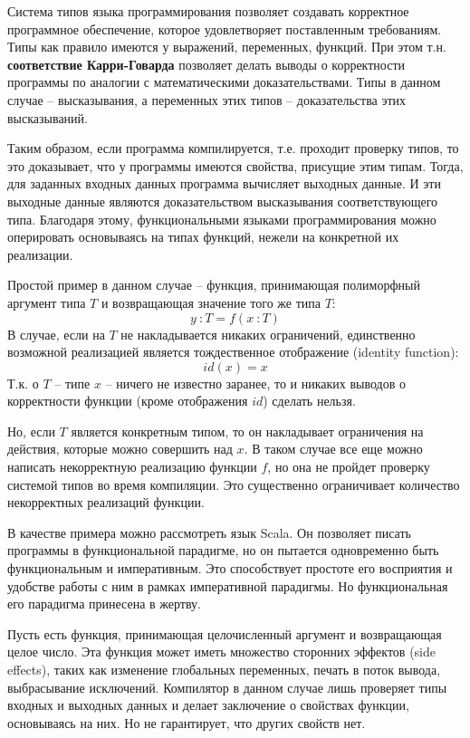 \documentclass[a4paper,14pt]{extreport} %
\begin{document}
Система типов языка программирования позволяет создавать корректное программное обеспечение, которое удовлетворяет поставленным требованиям. Типы как правило имеются у выражений, переменных, функций. При этом т.н. \textbf{соответствие Карри-Говарда} позволяет делать выводы о корректности программы по аналогии с математическими доказательствами. Типы в данном случае -- высказывания, а переменных этих типов -- доказательства этих высказываний.

Таким образом, если программа компилируется, т.е. проходит проверку типов, то это доказывает, что у программы имеются свойства, присущие этим типам. Тогда, для заданных входных данных программа вычисляет выходных данные. И эти выходные данные являются доказательством высказывания соответствующего типа. Благодаря этому, функциональными языками программирования можно оперировать основываясь на типах функций, нежели на конкретной их реализации.

Простой пример в данном случае -- функция, принимающая полиморфный аргумент типа $T$ и возвращающая значение того же типа $T$:
$$y \ :T = f(x \ :T)$$
В случае, если на $T$ не накладывается никаких ограничений, единственно возможной реализацией является тождественное отображение (identity function):
$$id(x)=x$$
Т.к. о $T$ -- типе $x$ -- ничего не известно заранее, то и никаких выводов о корректности функции (кроме отображения $id$) сделать нельзя.

Но, если $T$ является конкретным типом, то он накладывает ограничения на действия, которые можно совершить над $x$. В таком случае все еще можно написать некорректную реализацию функции $f$, но она не пройдет проверку системой типов во время компиляции. Это существенно ограничивает количество некорректных реализаций функции.

В качестве примера можно рассмотреть язык Scala. Он позволяет писать программы в функциональной парадигме, но он пытается одновременно быть функциональным и императивным. Это способствует простоте его восприятия и удобстве работы с ним в рамках императивной парадигмы. Но функциональная его парадигма принесена в жертву.

Пусть есть функция, принимающая целочисленный аргумент и возвращающая целое число. Эта функция может иметь множество сторонних эффектов (side effects), таких как изменение глобальных переменных, печать в поток вывода, выбрасывание исключений. Компилятор в данном случае лишь проверяет типы входных и выходных данных и делает заключение о свойствах функции, основываясь на них. Но не гарантирует, что других свойств нет.
\end{document}
